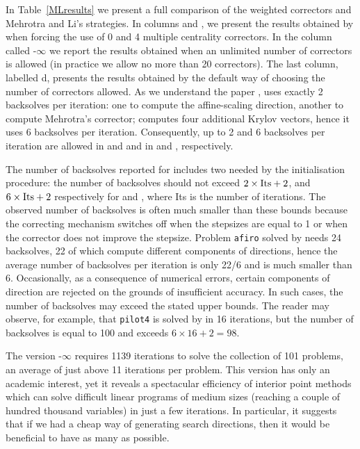 In Table~\ref{MLresults} we present a full comparison of the
weighted correctors and Mehrotra and Li's strategies.
In columns  and , we present 
the results obtained by \HOPDM when forcing the use of 0 and 4 
multiple centrality correctors. 
In the column called \HO-$\infty$ we report the results 
obtained when an unlimited number of correctors is allowed
(in practice we allow no more than 20 correctors).
The last column, labelled d\HO, presents the results obtained 
by the default way of choosing the number of correctors allowed.
As we understand the paper \cite{MehrotraLi},  uses exactly 
2 backsolves per iteration: one to compute the affine-scaling direction,
another to compute Mehrotra's corrector;  computes
four additional Krylov vectors, hence it uses
6 backsolves per iteration.
Consequently, up to 2 and 6 backsolves per iteration are allowed
in  and  and in  and , respectively.

The number of backsolves reported for \HOPDM includes two needed by 
the initialisation procedure: the number of backsolves 
should not exceed $2 \times {\rm Its} + 2$, 
and $6 \times {\rm Its} + 2$ respectively
for  and , where {\rm  Its} is the number of iterations.
The observed number of backsolves is often much smaller
than these bounds because the correcting mechanism switches off 
when the stepsizes are equal to 1 or when the corrector does not 
improve the stepsize. Problem {\tt afiro} solved by  needs 24 
backsolves, 22 of which compute different components of directions, 
hence the average number of backsolves per iteration is only 22/6 
and is much smaller than 6. Occasionally,
as a consequence of numerical errors, certain components 
of direction are rejected on the grounds of insufficient accuracy.
In such cases, the number of backsolves may exceed the stated upper bounds.
The reader may observe, for example, that {\tt pilot4} is solved by 
in 16 iterations, but the number of backsolves is equal to 100 and 
exceeds $6 \times 16 + 2 = 98$.

The version \HO-$\infty$ requires 1139 iterations to solve 
the collection of 101 problems, an average of just above 11 iterations
per problem. This version has only an academic interest, 
yet it reveals a spectacular efficiency of interior point 
methods which can solve difficult linear programs of medium sizes 
(reaching a couple of hundred thousand variables) in just 
a few iterations.
In particular, it suggests that if we had a cheap way of generating
search directions, then it would be beneficial to have as many as possible.

